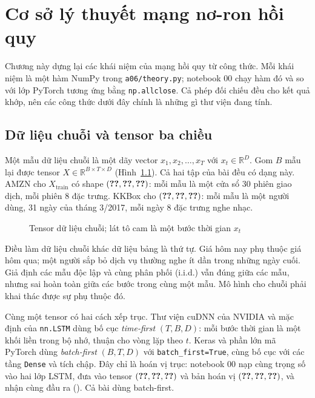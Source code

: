 \chapter{Cơ sở lý thuyết mạng nơ-ron hồi quy}
\label{ch:lythuyet}

Chương này dựng lại các khái niệm của mạng hồi quy từ công thức. Mỗi khái niệm là một hàm NumPy trong
\texttt{a06/theory.py}; notebook 00 chạy hàm đó và so với lớp PyTorch tương ứng bằng \texttt{np.allclose}. Cả
 phép đối chiếu đều cho kết quả khớp, nên các công thức dưới đây chính là những gì thư viện
đang tính.

\section{Dữ liệu chuỗi và tensor ba chiều}

Một mẫu dữ liệu chuỗi là một dãy vector $x_1, x_2, \dots, x_T$ với $x_t \in \mathbb{R}^D$. Gom $B$ mẫu lại được
tensor $X \in \mathbb{R}^{B \times T \times D}$ (Hình~\ref{fig:tensor}). Cả hai tập của bài đều có dạng này. AMZN
cho $X_{\text{train}}$ có shape $(\SL{theory/shapes/amzn/0}, \SL{theory/shapes/amzn/1}, \SL{theory/shapes/amzn/2})$:
mỗi mẫu là một cửa sổ 30 phiên giao dịch, mỗi phiên 8 đặc trưng. KKBox cho
$(\SL{theory/shapes/kkbox/0}, \SL{theory/shapes/kkbox/1}, \SL{theory/shapes/kkbox/2})$: mỗi mẫu là một người dùng,
31 ngày của tháng 3/2017, mỗi ngày 8 đặc trưng nghe nhạc.

\begin{figure}[H]
  \centering
  \caption{Tensor dữ liệu chuỗi; lát tô cam là một bước thời gian $x_t$}
  \label{fig:tensor}
\end{figure}

Điều làm dữ liệu chuỗi khác dữ liệu bảng là thứ tự. Giá hôm nay phụ thuộc giá hôm qua; một người sắp bỏ dịch vụ
thường nghe ít dần trong những ngày cuối. Giả định các mẫu độc lập và cùng phân phối (i.i.d.) vẫn đúng giữa các
mẫu, nhưng sai hoàn toàn giữa các bước trong cùng một mẫu. Mô hình cho chuỗi phải khai thác được sự phụ thuộc đó.

Cùng một tensor có hai cách xếp trục. Thư viện cuDNN của NVIDIA và mặc định của \texttt{nn.LSTM} dùng bố cục
\emph{time-first} $(T, B, D)$: mỗi bước thời gian là một khối liền trong bộ nhớ, thuận cho vòng lặp theo $t$. Keras và
phần lớn mã PyTorch dùng \emph{batch-first} $(B, T, D)$ với \texttt{batch\_first=True}, cùng bố cục với các tầng
\texttt{Dense} và tích chập. Đây chỉ là hoán vị trục: notebook 00 nạp cùng trọng số vào hai lớp LSTM, đưa vào tensor
$(\SL{theory/layout/bf_in/0}, \SL{theory/layout/bf_in/1}, \SL{theory/layout/bf_in/2})$ và bản hoán vị
$(\SL{theory/layout/tf_in/0}, \SL{theory/layout/tf_in/1}, \SL{theory/layout/tf_in/2})$, và nhận cùng đầu ra
(). Cả bài dùng batch-first.

